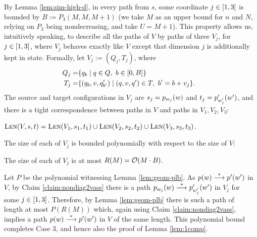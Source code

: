 By Lemma \ref{lem:sim-high-d},
in every path from $s$, some coordinate
$j\in[1, 3]$ is bounded by $B:=P_3(M, M, M+1)$ (we take $M$ as an upper bound for $n$ and $N$,
relying on $P_3$ being nondecreasing, and take $U=M+1$).
This property allows us, intuitively speaking, to describe all the paths of $V$ by paths of three
\geomvass $V_j$, for $j\in[1, 3]$, where $V_j$ behaves exactly like $V$ except that dimension $j$ is additionally kept in state.
%
Formally, let $V_j := (Q_j, T_j)$, where 
\begin{align*}
Q_j = & \setof{\pair q b}{q\in Q, \ b \in \setfromto 0 B} \\
T_j =  & \setof{(\pair q b, v, \pair {q'}{b'})}{(q, v, q')\in T, \ b' = b + v_j}.
\end{align*}
%
The source and target configurations in $V_j$ are $s_j = p_{w_j}(w)$ and $t_j = p'_{w'_j}(w')$,
and there is a tight correspondence between paths in $V$ and paths in $V_1, V_2, V_3$:
%
\begin{claim} \label{claim:nondiag2vass}
$\textsc{Len}(V, s, t) = \textsc{Len}(V_1, s_1, t_1) \cup \textsc{Len}(V_2, s_2, t_2) \cup \textsc{Len}(V_3, s_3, t_3)$.
\end{claim}
%
The size of each of $V_j$ is bounded polynomially with respect to the size of $V$:
%
\begin{claim} \label{claim:nondiagsize}
The size of each of $V_j$ is at most $R(M)={\cal O}(M\cdot B)$.
\end{claim}
%
Let $P$ be the polynomial witnessing Lemma \ref{lem:geom-plb}.
As $p(w) \stackrel{*}{\longrightarrow} p'(w')$ in $V$,
by Claim \ref{claim:nondiag2vass}
there is a path $p_{w_j}(w) \stackrel{*}{\longrightarrow} p'_{w'_j}({w'})$ in $V_j$
for some $j\in[1, 3]$.
Therefore, by Lemma \ref{lem:geom-plb} there is such a path of length 
at most $P(R(M))$ which,
again using Claim \ref{claim:nondiag2vass}, implies a path $p(w) \stackrel{*}{\longrightarrow} p'(w')$ in $V$ of the same length.
%
This polynomial bound completes Case 3, and hence also the proof of
Lemma \ref{lem:1comp}.
%

